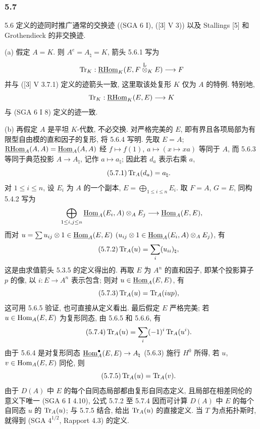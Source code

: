 \subsubsection*{5.7}

5.6 定义的迹同时推广通常的交换迹 ((SGA 6 I), ([3] V 3)) 以及 Stallings [5] 和 Grothendieck 的非交换迹.

(a) 假定 $A=K$. 则 $A^e=A_\natural=K$, 箭头 5.6.1 写为
\[
\operatorname{Tr}_K:\underline{\mathrm{RHom}}_K(E,F\overset{\mathrm L}{\otimes}_KE)\longrightarrow F
\]
并与 ([3] V 3.7.1) 定义的迹箭头一致, 这里取该处复形 $K$ 仅为 $A$ 的特例. 特别地,
\[
\operatorname{Tr}_K:\underline{\mathrm{RHom}}_K(E,E)\longrightarrow K
\]
与 (SGA 6 I 8) 定义的迹一致.

(b) 再假定 $A$ 是平坦 $K$-代数, 不必交换. 对严格完美的 $E$, 即有界且各项局部为有限型自由模的直和因子的复形, 将 5.6.4 写明. 先取 $E=A$; $\underline{\mathrm{RHom}}_A(A,A)=\underline{\operatorname{Hom}}_A(A,A)$ 经 $f\mapsto f(1)$, $a\mapsto(x\mapsto xa)$ 等同于 $A$, 而 5.6.3 等同于典范投影 $A\to A_\natural$, 记作 $a\mapsto a_\natural$; 因此若 $d_a$ 表示右乘 $a$,
\begin{equation}\tag{5.7.1}
\operatorname{Tr}_A(d_a)=a_\natural.
\end{equation}
对 $1\le i\le n$, 设 $E_i$ 为 $A$ 的一个副本, $E=\bigoplus_{1\le i\le n}E_i$. 取 $F=A$, $G=E$, 同构 5.4.2 写为
\[
\bigoplus_{1\le i,j\le n}\underline{\operatorname{Hom}}_A(E_i,A)\otimes_AE_j\longrightarrow\underline{\operatorname{Hom}}_A(E,E),
\]
而对 $u=\sum u_{ij}\otimes 1\in\underline{\operatorname{Hom}}_A(E,E)$ $(u_{ij}\otimes 1\in\underline{\operatorname{Hom}}_A(E_i,A)\otimes_A E_j)$, 有
\begin{equation}\tag{5.7.2}
\operatorname{Tr}_A(u)=\sum_i (u_{ii})_\natural,
\end{equation}
这是由求值箭头 5.3.5 的定义得出的. 再取 $E$ 为 $A^n$ 的直和因子, 即某个投影算子 $p$ 的像, 以 $i:E\to A^n$ 表示包含; 则对 $u\in\underline{\operatorname{Hom}}_A(E,E)$, 有
\begin{equation}\tag{5.7.3}
\operatorname{Tr}_A(u)=\operatorname{Tr}_A(iup),
\end{equation}
这可用 5.6.5 验证, 也可直接从定义看出. 最后假定 $E$ 严格完美; 若 $u\in\operatorname{Hom}_A(E,E)$ 为复形同态, 由 5.6.5 和 5.6.6, 有
\begin{equation}\tag{5.7.4}
\operatorname{Tr}_A(u)=\sum_i(-1)^i\operatorname{Tr}_A(u^i).
\end{equation}
由于 5.6.4 是对复形同态 $\underline{\operatorname{Hom}}_A^\bullet(E,E)\to A_\natural$ (5.6.3) 施行 $H^0$ 所得, 若 $u$, $v\in\operatorname{Hom}_A(E,E)$ 同伦, 则
\begin{equation}\tag{5.7.5}
\operatorname{Tr}_A(u)=\operatorname{Tr}_A(v).
\end{equation}
由于 $D(A)$ 中 $E$ 的每个自同态局部都由复形自同态定义, 且局部在相差同伦的意义下唯一 (SGA 6 I 4.10), 公式 5.7.2 至 5.7.4 因而可计算 $D(A)$ 中 $E$ 的每个自同态 $u$ 的 $\operatorname{Tr}_A(u)$; 与 5.7.5 结合, 给出 $\operatorname{Tr}_A(u)$ 的直接定义. 当 $T$ 为点拓扑斯时, 就得到 (SGA $4^{1/2}$, Rapport 4.3) 的定义.


